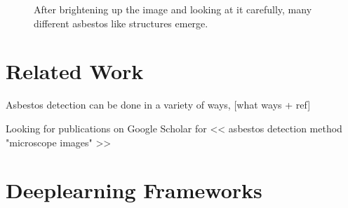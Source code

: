 \begin{figure}[h]
\centering


\caption{After brightening up the image and looking at it carefully, many different asbestos like structures emerge.}
\label{fig:non-asbestos_examples}
\end{figure}

\section{Related Work}

Asbestos detection can be done in a variety of ways, [what ways + ref]

Looking for publications on Google Scholar for << asbestos detection method "microscope images" >>

\section{Deeplearning Frameworks}

